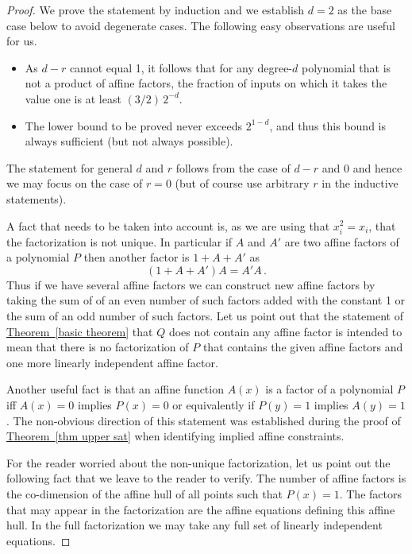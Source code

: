 \documentclass[10pt]{article}
\theoremstyle{definition}
\numberwithin{equation}{section}
\newcommand{\expref}[2]{\texorpdfstring{\hyperref[#2]{#1~\ref{#2}}}{#1~\ref{#2}}}
\begin{document}
\begin{proof}
We prove the statement by induction and
we establish $d=2$ as the base case below
to avoid degenerate cases.  The following
easy observations are useful for us.

\begin{itemize}
\item As $d-r$ cannot equal 1, it follows
that for any degree-$d$ polynomial that
is not a product of affine factors, the
fraction of inputs on which it takes
the value one is at least $(3/2)\, 2^{-d}$.

\item The lower bound to be proved never exceeds 
$2^{1-d}$, and thus this bound is
always sufficient (but not always possible).
\end{itemize}
The statement for general $d$ and $r$ follows
from the case of $d-r$ and $0$ and hence we
may focus on the case of $r=0$ (but of course
use arbitrary $r$ in the inductive statements).

A fact that needs to be taken into account is, as we
are using that $x_i^2=x_i$,
that the factorization is not unique.  In
particular if $A$ and $A'$ are
two affine factors of a polynomial $P$ then another
factor is $1+A+A'$
as 
$$
(1+A+A')A=A'A\,.
$$
Thus if we have several affine factors
we can construct new affine factors by taking
the sum of of an even number of such factors
added with the constant 1 or the sum of
an odd number of such factors. 
Let us point out that the statement
of \expref{Theorem}{basic theorem} that $Q$ does not
contain any affine factor is intended to mean that there is no
factorization of $P$ that contains the given
affine factors and one more linearly independent
affine factor.

Another useful
fact is that an affine function $A(x)$ is a factor of 
a polynomial $P$
iff $A(x)=0$ implies $P(x)=0$ or equivalently
if $P(y)=1$ implies $A(y)=1$.  The non-obvious
direction of this statement was established during
the proof of \expref{Theorem}{thm upper sat}
when identifying implied affine constraints.

For the reader worried about the non-unique factorization,
let us point out the following fact that we leave to
the reader to verify.  The number of affine factors
is the co-dimension of the affine hull of all
points such that $P(x)=1$.  The factors that
may appear in the factorization are the affine equations
defining this affine hull.  In the full factorization
we may take any full set of linearly independent
equations.


\end{proof}
\end{document}
